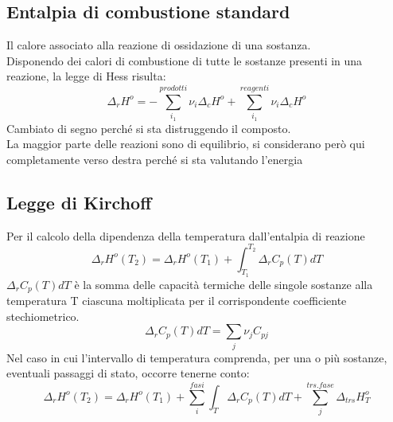 \documentclass{article}
\begin{document}
\subsection{Entalpia di combustione standard}
Il calore associato alla reazione di ossidazione di una sostanza. \\
Disponendo dei calori di combustione di tutte le sostanze presenti in una reazione, la legge di Hess risulta:
\begin{equation*}
    \Delta_rH^o=-\sum_{i_1}^{prodotti}\nu_i\Delta_cH^o+\sum_{i_1}^{reagenti}\nu_i\Delta_cH^o
\end{equation*}
Cambiato di segno perché si sta distruggendo il composto.
\\ La maggior parte delle reazioni sono di equilibrio, si considerano però qui completamente verso destra perché si sta valutando l'energia

\subsection{Legge di Kirchoff}
Per il calcolo della dipendenza della temperatura dall'entalpia di reazione
\begin{equation*}
    \Delta_rH^o(T_2)=\Delta_rH^o(T_1)+\int_{T_1}^{T_2}\Delta_rC_p(T)dT
\end{equation*}
$\Delta_rC_p(T)dT$ è la somma delle capacità termiche delle singole sostanze alla temperatura T ciascuna moltiplicata per il corrispondente coefficiente stechiometrico.
\begin{equation*}
    \Delta_rC_p(T)dT=\sum_j\nu_jC_{pj}
\end{equation*}
Nel caso in cui l'intervallo di temperatura comprenda, per una o più sostanze, eventuali passaggi di stato, occorre tenerne conto:
\begin{equation*}
    \Delta_rH^o(T_2)=\Delta_rH^o(T_1)+\sum_i^{fasi}\int_T\Delta_rC_p(T)dT+\sum_j^{trs. fase}\Delta_{trs}H_T^o
\end{equation*}
\end{document}
